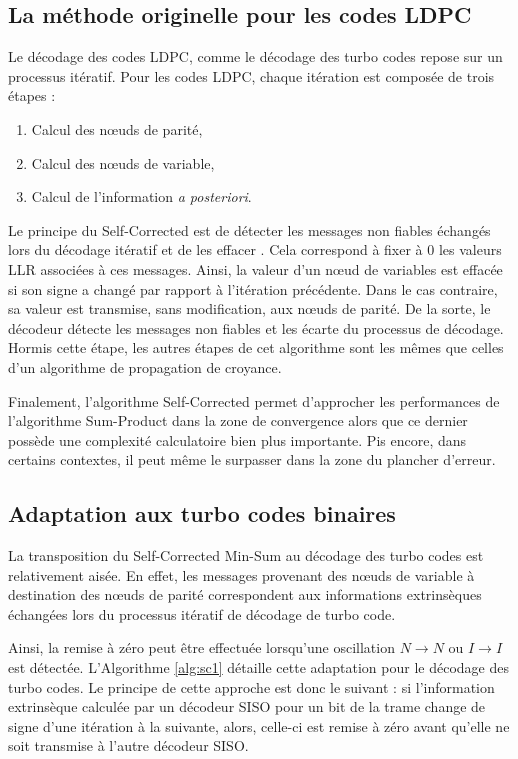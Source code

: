 \subsection{La méthode originelle pour les codes LDPC}
Le décodage des codes LDPC, comme le décodage des turbo codes repose sur un processus itératif. Pour les codes LDPC,
chaque itération est composée de trois étapes : 
\begin{enumerate}
	\item Calcul des nœuds de parité,%
	\item Calcul des nœuds de variable,%
	\item Calcul de l'information \textit{a posteriori}.%
\end{enumerate}
Le principe du Self-Corrected est de détecter les messages non fiables échangés lors du décodage itératif et de les \og 
effacer \fg. Cela correspond à fixer à 0 les valeurs LLR associées à ces messages. Ainsi, la valeur d'un nœud de 
variables  est effacée si son signe a changé par rapport à l’itération précédente. Dans le cas contraire, sa 
valeur est transmise, sans modification, aux nœuds de 
parité. De la sorte, le décodeur détecte les messages non fiables et les écarte du processus de décodage. Hormis cette 
étape, les autres étapes de cet algorithme sont les mêmes que celles d'un algorithme de propagation de croyance.

Finalement, l'algorithme Self-Corrected permet d'approcher les performances de l'algorithme Sum-Product dans la zone de convergence alors
que ce dernier possède une complexité calculatoire bien plus importante. Pis encore, dans certains contextes, il peut même le 
surpasser dans la zone du plancher d'erreur.

\subsection{Adaptation aux turbo codes binaires}
La transposition du Self-Corrected Min-Sum au décodage des turbo codes est relativement aisée. En effet, les messages provenant 
des nœuds de variable à destination des nœuds de parité correspondent aux informations extrinsèques échangées lors 
du processus itératif de décodage de turbo code.

Ainsi, la remise à zéro peut être effectuée lorsqu'une oscillation $N \rightarrow N$ ou $I \rightarrow I$ est détectée.
L'Algorithme \ref{alg:sc1} détaille cette adaptation pour le décodage des turbo codes. Le principe de cette approche est 
donc le suivant : si l’information extrinsèque calculée par un décodeur SISO pour un bit de la trame change de 
signe d’une itération à la suivante, alors, celle-ci est remise à zéro avant qu’elle ne soit transmise à l’autre 
décodeur SISO.

